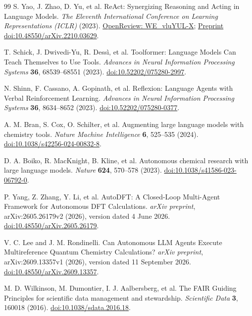 \documentclass[a4paper,11pt]{article}
\begin{document}
\begin{thebibliography}{99}
  S. Yao, J. Zhao, D. Yu, et al.
  ReAct: Synergizing Reasoning and Acting in Language Models.
  \emph{The Eleventh International Conference on Learning Representations (ICLR)} (2023).
  \href{https://openreview.net/forum?id=WE_vluYUL-X}{OpenReview: WE\_vluYUL-X};
  \href{https://doi.org/10.48550/arXiv.2210.03629}{Preprint doi:10.48550/arXiv.2210.03629}.

  T. Schick, J. Dwivedi-Yu, R. Dessì, et al.
  Toolformer: Language Models Can Teach Themselves to Use Tools.
  \emph{Advances in Neural Information Processing Systems} \textbf{36}, 68539--68551 (2023).
  \href{https://doi.org/10.52202/075280-2997}{doi:10.52202/075280-2997}.

  N. Shinn, F. Cassano, A. Gopinath, et al.
  Reflexion: Language Agents with Verbal Reinforcement Learning.
  \emph{Advances in Neural Information Processing Systems} \textbf{36}, 8634--8652 (2023).
  \href{https://doi.org/10.52202/075280-0377}{doi:10.52202/075280-0377}.

  A. M. Bran, S. Cox, O. Schilter, et al.
  Augmenting large language models with chemistry tools.
  \emph{Nature Machine Intelligence} \textbf{6}, 525--535 (2024).
  \href{https://doi.org/10.1038/s42256-024-00832-8}{doi:10.1038/s42256-024-00832-8}.

  D. A. Boiko, R. MacKnight, B. Kline, et al.
  Autonomous chemical research with large language models.
  \emph{Nature} \textbf{624}, 570--578 (2023).
  \href{https://doi.org/10.1038/s41586-023-06792-0}{doi:10.1038/s41586-023-06792-0}.

  P. Yang, Z. Zhang, Y. Li, et al.
  AutoDFT: A Closed-Loop Multi-Agent Framework for Autonomous DFT Calculations.
  \emph{arXiv preprint}, arXiv:2605.26179v2 (2026), version dated 4 June 2026.
  \href{https://doi.org/10.48550/arXiv.2605.26179}{doi:10.48550/arXiv.2605.26179}.

  V. C. Lee and J. M. Rondinelli.
  Can Autonomous LLM Agents Execute Multireference Quantum Chemistry Calculations?
  \emph{arXiv preprint}, arXiv:2609.13357v1 (2026), version dated 11 September 2026.
  \href{https://doi.org/10.48550/arXiv.2609.13357}{doi:10.48550/arXiv.2609.13357}.

  M. D. Wilkinson, M. Dumontier, I. J. Aalbersberg, et al.
  The FAIR Guiding Principles for scientific data management and stewardship.
  \emph{Scientific Data} \textbf{3}, 160018 (2016).
  \href{https://doi.org/10.1038/sdata.2016.18}{doi:10.1038/sdata.2016.18}.


\end{thebibliography}
\end{document}
